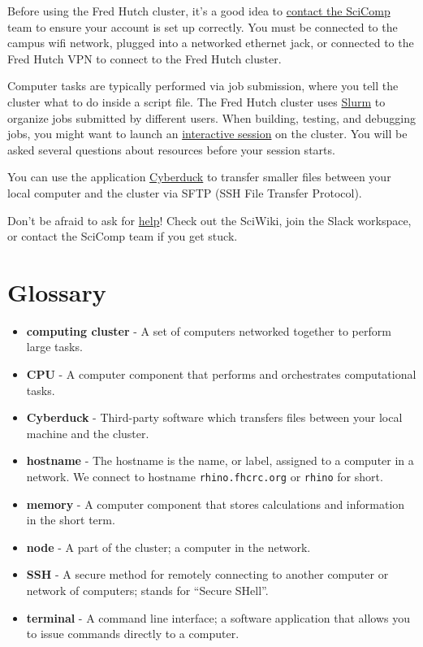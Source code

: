 \documentclass[
]{book}
\providecommand{\tightlist}{%
  \setlength{\itemsep}{0pt}\setlength{\parskip}{0pt}}
\begin{document}
Before using the Fred Hutch cluster, it's a good idea to \protect\hyperlink{account-setup}{contact the SciComp} team to ensure your account is set up correctly. You must be connected to the campus wifi network, plugged into a networked ethernet jack, or connected to the Fred Hutch VPN to connect to the Fred Hutch cluster.

Computer tasks are typically performed via job submission, where you tell the cluster what to do inside a script file. The Fred Hutch cluster uses \protect\hyperlink{submit-your-first-job}{Slurm} to organize jobs submitted by different users. When building, testing, and debugging jobs, you might want to launch an \protect\hyperlink{interactive-session}{interactive session} on the cluster. You will be asked several questions about resources before your session starts.

You can use the application \protect\hyperlink{file-upload-and-download}{Cyberduck} to transfer smaller files between your local computer and the cluster via SFTP (SSH File Transfer Protocol).

Don't be afraid to ask for \protect\hyperlink{help}{help}! Check out the SciWiki, join the Slack workspace, or contact the SciComp team if you get stuck.

\hypertarget{glossary}{%
\section{Glossary}\label{glossary}}

\begin{itemize}
\tightlist
\item
  \textbf{computing cluster} - A set of computers networked together to perform large tasks.
\item
  \textbf{CPU} - A computer component that performs and orchestrates computational tasks.
\item
  \textbf{Cyberduck} - Third-party software which transfers files between your local machine and the cluster.
\item
  \textbf{hostname} - The hostname is the name, or label, assigned to a computer in a network. We connect to hostname \texttt{rhino.fhcrc.org} or \texttt{rhino} for short.
\item
  \textbf{memory} - A computer component that stores calculations and information in the short term.
\item
  \textbf{node} - A part of the cluster; a computer in the network.
\item
  \textbf{SSH} - A secure method for remotely connecting to another computer or network of computers; stands for ``Secure SHell''.
\item
  \textbf{terminal} - A command line interface; a software application that allows you to issue commands directly to a computer.
\end{itemize}
\end{document}
